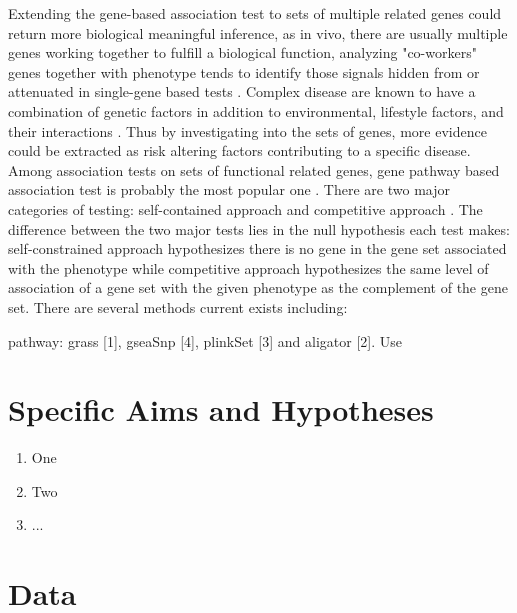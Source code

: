 \documentclass[12pt]{article}
\begin{document}
Extending the gene-based association test to sets of multiple related genes could return more biological meaningful inference, as in vivo, there are usually multiple genes working together to fulfill a biological function, analyzing "co-workers" genes together with phenotype tends to identify those signals hidden from or attenuated in single-gene based tests \cite{BloodPressureGenome-WideAssociationStudies2011,Hirschhorn2009,Zhong2010,Wang2010}. Complex disease are known to have a combination of genetic factors in addition to environmental, lifestyle factors, and their interactions \cite{Hirschhorn2005,McCarthy2008}. Thus by investigating into the sets of genes, more evidence could be extracted as risk altering factors contributing to a specific disease. Among association tests on sets of functional related genes, gene pathway based association test is probably the most popular one \cite{DelaCruz2010,Wang2010}. There are two major categories of testing: self-contained approach and competitive approach \cite{Wang2010,Nam2008,Goeman2007}. The difference between the two major tests lies in the null hypothesis each test makes: self-constrained approach hypothesizes there is no gene in the gene set associated with the phenotype while competitive approach hypothesizes the same level of association of a gene set with the given phenotype as the complement of the gene set. There are several methods current exists including: 

pathway: grass [1], gseaSnp [4], plinkSet [3] and aligator [2]. Use

\newpage
\section{Specific Aims and Hypotheses}\label{sec:aims}

\begin{enumerate}
\item One

\item Two

\item ...
\end{enumerate}

\newpage
\section{Data}\label{sec:data}
\end{document}
